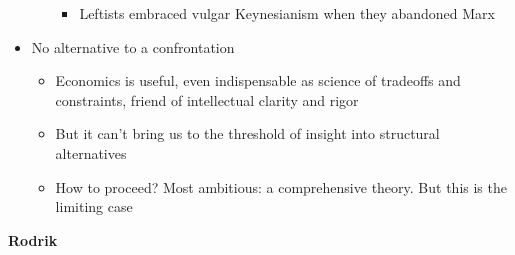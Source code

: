 \begin{itemize}
\begin{itemize}
    \begin{itemize}
    \tightlist
    \item
      Leftists embraced vulgar Keynesianism when they abandoned Marx
    \end{itemize}
  \end{itemize}
\item
  No alternative to a confrontation

  \begin{itemize}
  \tightlist
  \item
    Economics is useful, even indispensable as science of tradeoffs and
    constraints, friend of intellectual clarity and rigor
  \item
    But it can't bring us to the threshold of insight into structural
    alternatives
  \item
    How to proceed? Most ambitious: a comprehensive theory. But this is
    the limiting case
  \end{itemize}
\end{itemize}

\textbf{Rodrik}

